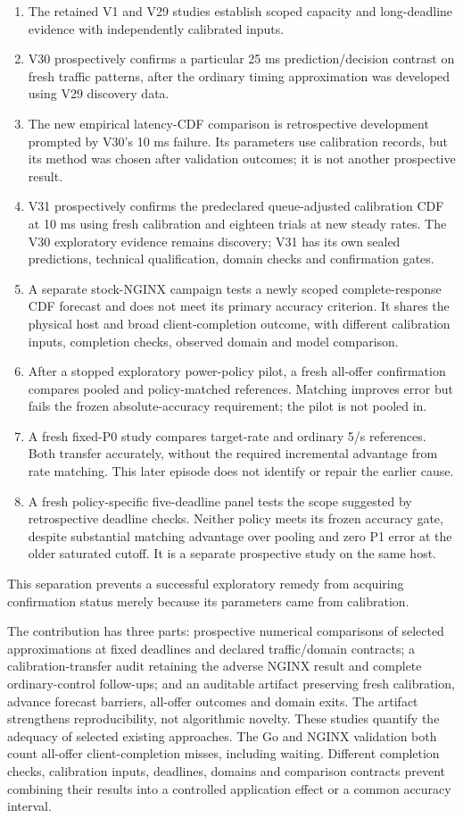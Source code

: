 \documentclass[11pt,a4paper]{article}
\begin{document}
\begin{enumerate}
\item The retained V1 and V29 studies establish scoped capacity and long-deadline
evidence with independently calibrated inputs.
\item V30 prospectively confirms a particular 25 ms prediction/decision contrast
on fresh traffic patterns, after the ordinary timing approximation was
developed using V29 discovery data.
\item The new empirical latency-CDF comparison is retrospective development
prompted by V30's 10 ms failure. Its parameters use calibration records,
but its method was chosen after validation outcomes; it is not another
prospective result.
\item V31 prospectively confirms the predeclared queue-adjusted calibration CDF at 10 ms
using fresh calibration and eighteen trials at new steady rates. The V30
exploratory evidence remains discovery; V31 has its own sealed predictions,
technical qualification, domain checks and confirmation gates.
\item A separate stock-NGINX campaign tests a newly scoped complete-response CDF
forecast and does not meet its primary accuracy criterion. It shares the
physical host and broad client-completion outcome, with different calibration
inputs, completion checks, observed domain and model comparison.
\item After a stopped exploratory power-policy pilot, a fresh all-offer confirmation
compares pooled and policy-matched references. Matching improves error but
fails the frozen absolute-accuracy requirement; the pilot is not pooled in.
\item A fresh fixed-P0 study compares target-rate and ordinary 5/s references.
Both transfer accurately, without the required incremental advantage from
rate matching. This later episode does not identify or repair the earlier cause.
\item A fresh policy-specific five-deadline panel tests the scope suggested by
retrospective deadline checks. Neither policy meets its frozen accuracy gate,
despite substantial matching advantage over pooling and zero P1 error at the
older saturated cutoff. It is a separate prospective study on the same host.
\end{enumerate}
This separation prevents a successful exploratory remedy from acquiring
confirmation status merely because its parameters came from calibration.

The contribution has three parts: prospective numerical comparisons of selected
approximations at fixed deadlines and declared traffic/domain contracts; a
calibration-transfer audit retaining the adverse NGINX result and complete
ordinary-control follow-ups; and an auditable artifact preserving fresh
calibration, advance forecast barriers, all-offer outcomes and domain exits.
The artifact strengthens reproducibility, not algorithmic novelty. These
studies quantify the adequacy of selected existing approaches. The
Go and NGINX validation both count all-offer client-completion misses, including
waiting. Different completion checks, calibration inputs, deadlines, domains
and comparison contracts prevent combining their results into a controlled
application effect or a common accuracy interval.
\end{document}
